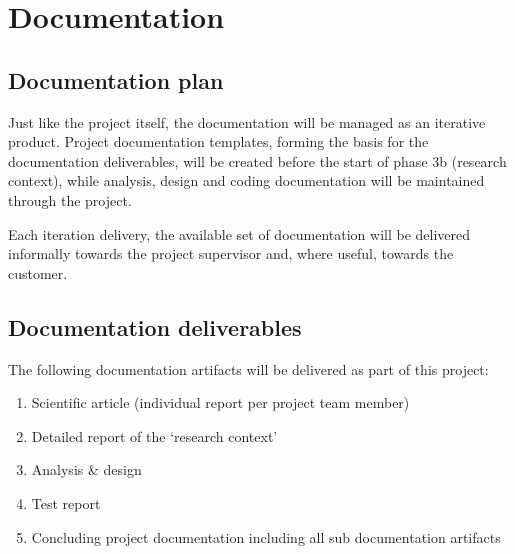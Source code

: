 
\section{Documentation}
\label{sec:documentation}
\subsection{Documentation plan}
Just like the project itself, the documentation will be managed as an iterative product.
Project documentation templates, forming the basis for the documentation deliverables, will be created before the start of phase 3b (research context), while analysis, design and coding documentation will be maintained through the project.

Each iteration delivery, the available set of documentation will be delivered informally towards the project supervisor and, where useful, towards the customer.

\subsection{Documentation deliverables}
The following documentation artifacts will be delivered as part of this project:
\begin{enumerate}
	\item Scientific article (individual report per project team member)
	\item Detailed report of the `research context'
	\item Analysis \& design
	\item Test report
	\item Concluding project documentation including all sub documentation artifacts
\end{enumerate}